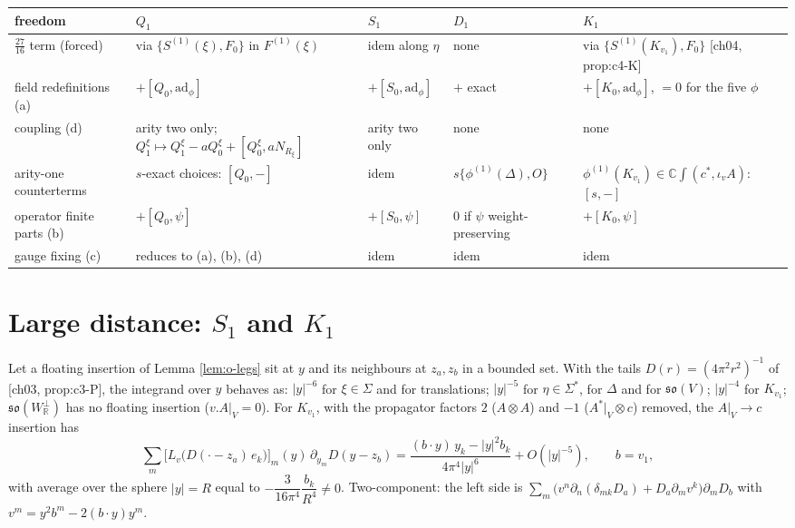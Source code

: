 \begin{tabular}{l|l|l|l|l}
freedom & $Q_1$ & $S_1$ & $D_1$ & $K_1$ \\
\hline
$\tfrac{27}{16}$ term (forced) & via $\{S^{(1)}(\xi),F_0\}$ in $F^{(1)}(\xi)$ & idem along $\eta$ & none & via $\{S^{(1)}(K_{v_1}),F_0\}$ [ch04, prop:c4-K] \\
field redefinitions (a) & $+[Q_0,\mathrm{ad}_\phi]$ & $+[S_0,\mathrm{ad}_\phi]$ & $+$ exact & $+[K_0,\mathrm{ad}_\phi]$, $=0$ for the five $\phi$ \\
coupling (d) & arity two only; $Q_1^\xi\mapsto Q_1^\xi-aQ_0^\xi+[Q_0^\xi,aN_{R_\xi}]$ & arity two only & none & none \\
arity-one counterterms & $s$-exact choices: $[Q_0,-]$ & idem & $s\{\phi^{(1)}(\Delta),O\}$ & $\phi^{(1)}(K_{v_1})\in\mathbb C\int(c^*,\iota_vA)$: $[s,-]$ \\
operator finite parts (b) & $+[Q_0,\psi]$ & $+[S_0,\psi]$ & $0$ if $\psi$ weight-preserving & $+[K_0,\psi]$ \\
gauge fixing (c) & reduces to (a), (b), (d) & idem & idem & idem \\
\end{tabular}

\section{Large distance: $S_1$ and $K_1$}

\begin{proposition}
\label{prop:o-ir}
Let a floating insertion of Lemma \ref{lem:o-legs} sit at $y$ and its neighbours at $z_a,z_b$ in a bounded set. With the tails $D(r)=(4\pi^2r^2)^{-1}$ of [ch03, prop:c3-P], the integrand over $y$ behaves as: $|y|^{-6}$ for $\xi\in\Sigma$ and for translations; $|y|^{-5}$ for $\eta\in\Sigma^*$, for $\Delta$ and for $\mathfrak{so}(V)$; $|y|^{-4}$ for $K_{v_1}$; $\mathfrak{so}(W_{\mathbb R}^\perp)$ has no floating insertion ($v.A|_V=0$). For $K_{v_1}$, with the propagator factors $2$ ($A\otimes A$) and $-1$ ($A^*|_V\otimes c$) removed, the $A|_V\to c$ insertion has
\begin{equation}
\sum_m\big[L_v\big(D(\cdot-z_a)\,e_k\big)\big]_m(y)\,\partial_{y_m}D(y-z_b)=\frac{(b\cdot y)\,y_k-|y|^2b_k}{4\pi^4|y|^6}+O(|y|^{-5}),\qquad b=v_1,
\label{eq:o-Kir}
\end{equation}
with average over the sphere $|y|=R$ equal to $-\dfrac{3}{16\pi^4}\dfrac{b_k}{R^4}\neq0$. Two-component: the left side is $\sum_m\big(v^n\partial_n(\delta_{mk}D_a)+D_a\partial_mv^k\big)\partial_mD_b$ with $v^m=y^2b^m-2(b\cdot y)y^m$.
\end{proposition}

